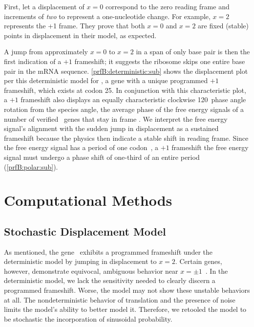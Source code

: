 \documentclass[12pt]{article}
\begin{document}
First, \citeauthor{lalit:mechanics} let a displacement of $x = 0$ correspond
to the zero reading frame and increments of \emph{two} to represent a
one-nucleotide change. For example, $x =2$ represents the +1 frame.
They prove that both $x = 0$ and $x = 2$ are fixed
(stable) points in displacement in their model, as expected.

A jump from approximately $x = 0$ to $x = 2$ in a span of only
base pair is then the first indication of a $+1$ frameshift; it
suggests the ribosome skips one entire base pair in the mRNA sequence.
\autoref{prfB:deterministic:sub} shows the displacement plot per this
deterministic model for \prfB, a gene with a unique programmed $+1$
frameshift, which exists at codon 25. In conjunction with this
characteristic plot, a $+1$ frameshift also displays an equally
characteristic clockwise 120\degree\ phase angle rotation from the
species angle, the average phase of the free energy signals of a
number of verified \ecoli\ genes that stay in frame
\cite{lalit:mechanics}.  We interpret the free energy signal's
alignment with the sudden jump in displacement as a sustained
frameshift because the physics then indicate a stable shift in
reading frame. Since the free energy signal has a period of one
codon~\cite{lalit:mechanics}, a $+1$ frameshift the free energy signal
must undergo a phase shift of one-third of an entire period
(\autoref{prfB:polar:sub}).

\section{Computational Methods}

\subsection{Stochastic Displacement Model}
\label{stochastic}

As mentioned, the gene \prfB\ exhibits a programmed frameshift under
the deterministic model by jumping in displacement to $x=2$.  Certain
genes, however, demonstrate equivocal, ambiguous behavior near
$x = \pm 1$~\cite{lalit:mechanics}.  In the deterministic model, we lack the
sensitivity needed to clearly discern a programmed
frameshift. Worse, the model may not show these unstable
behaviors at all. The nondeterministic
behavior of translation and the presence of noise limits the model's
ability to better model it. Therefore, we retooled the model to be
stochastic the incorporation of sinusoidal probability.
\end{document}
